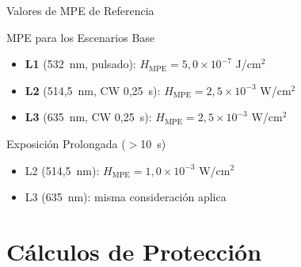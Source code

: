 \documentclass[aspectratio=169,12pt]{beamer}
\begin{document}
\begin{frame}{Valores de MPE de Referencia}
	\begin{block}{MPE para los Escenarios Base}
		\begin{itemize}
			\item \textbf{L1} (532~nm, pulsado): $H_\mathrm{MPE} = 5{,}0\times10^{-7}$ J/cm$^2$
			\item \textbf{L2} (514,5~nm, CW 0,25~s): $H_\mathrm{MPE} = 2{,}5\times10^{-3}$ W/cm$^2$
			\item \textbf{L3} (635~nm, CW 0,25~s): $H_\mathrm{MPE} = 2{,}5\times10^{-3}$ W/cm$^2$
		\end{itemize}
	\end{block}
	\vspace{0.3cm}
	\begin{alertblock}{Exposición Prolongada ($>$10~s)}
		\begin{itemize}
			\item L2 (514,5~nm): $H_\mathrm{MPE} = 1{,}0\times10^{-3}$ W/cm$^2$
			\item L3 (635~nm): misma consideración aplica
		\end{itemize}
	\end{alertblock}
\end{frame}

\section{Cálculos de Protección}
\end{document}
